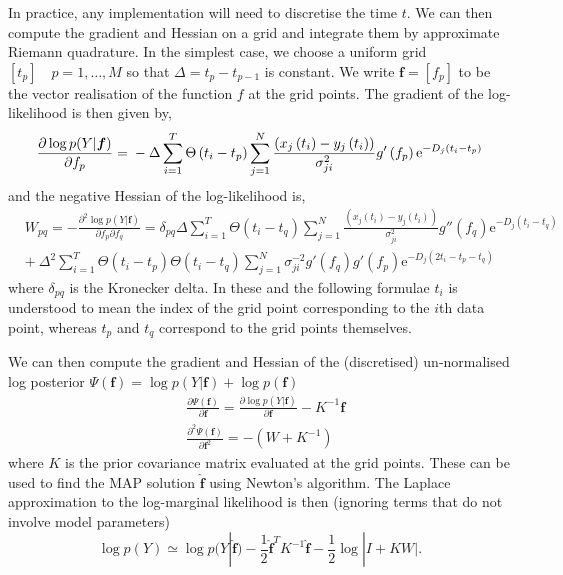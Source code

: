 \documentclass[english]{article}
\begin{document}
In practice, any implementation will need to discretise the time $t$. 
We can then compute the gradient and Hessian on a grid and 
integrate them by approximate Riemann quadrature. 
In the simplest case, we
choose a uniform grid $\left[t_p\right]\quad p=1,\ldots,M$ so that $\Delta=t_p-t_{p-1}$ is constant. We
write $\bm f=\left[f_p\right]$ to be the vector realisation of the function
$f$ at the grid points. The gradient of the log-likelihood is then given by,
\begin{equation}
\frac{\partial \log p(Y|\bm f)}{\partial f_p} =\\ 
-\Delta\sum_{i=1}^T \Theta\left(t_i- t_p\right)\sum_{j=1}^N  
\frac{\left(x_j\left(t_i\right) - y_{j}\left(t_i\right)\right)}{\sigma^2_{ji} }g'\left(f_p\right) \mathrm{e}^{-D_j\left(t_i-t_p\right)}\label{funcGrad}
\end{equation}
and the negative Hessian of the log-likelihood is,
\begin{equation}\begin{split}
&W_{pq} = -\frac{\partial^2\log p(Y|\bm f)}{\partial f_p\partial f_q} = \delta_{pq}\Delta  \sum_{i=1}^T
\Theta\left(t_i-t_q\right)\sum_{j=1}^N \frac{\left(x_j\left(t_i\right) - y_{j}\left(t_i\right)\right)}{\sigma^2_{ji} }
g''\left(f_q\right)
 \mathrm{e}^{-D_j\left(t_i-t_q\right)} \\
&+ \:\Delta ^2\sum_{i=1}^T \Theta\left(t_i-t_p\right)\Theta\left(t_i-t_q\right)\sum_{j=1}^N \sigma_{ji}^{-2} 
g'\left(f_q\right) g'\left(f_p\right)
\mathrm{e}^{-D_j\left(2t_i-t_p-t_q\right)} \label{funcHess}
\end{split}\end{equation}
where $\delta_{pq}$ is the Kronecker delta. In these and the following formulae $t_i$ is understood to mean the index of the grid point corresponding to the $i$th data point, whereas $t_p$ and $t_q$ correspond to the grid points themselves.

We can then compute the gradient and Hessian of the (discretised) 
un-normalised log posterior
$\Psi(\bm f) = \log p(Y|\bm f) + \log p(\bm f)$ 
\cite[see][chapter 3]{Rasmussen:book05}
\begin{equation}\begin{split}
&\frac{\partial\Psi(\bm f)}{\partial\bm f}  = \frac{\partial\log p(Y|\bm f)}{\partial\bm f} -K^{-1}{\bm f} \\
&\frac{\partial^2\Psi(\bm f)}{\partial\bm f^2} = - (W + K^{-1})\label{postGrid}
\end{split}\end{equation}
where $K$ is the prior covariance matrix evaluated at the grid points. These 
can be used to find the MAP solution $\hat{\bm f}$ using Newton's algorithm.
The Laplace approximation to the log-marginal likelihood is then 
(ignoring terms that do not involve model parameters)
\begin{equation}
\log p(Y)  \simeq   \log p(Y|\hat{\bm f}) - \mbox{$\frac{1}{2}$}\hat{\bm f}^T K^{-1}
\hat{\bm f} - \mbox{$\frac{1}{2}$}\log|I+KW|. 
\label{eqn_marginal}
\end{equation}
\end{document}
